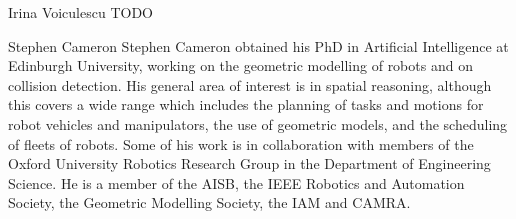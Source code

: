\documentclass[10pt,twocolumn,twoside]{IEEEtran}
\begin{document}
\begin{IEEEbiography}{Irina Voiculescu}
TODO
\end{IEEEbiography}

\begin{IEEEbiography}{Stephen Cameron}
Stephen Cameron obtained his PhD in Artificial Intelligence at Edinburgh University, working on the geometric modelling of robots and on collision detection. His general area of interest is in spatial reasoning, although this covers a wide range which includes the planning of tasks and motions for robot vehicles and manipulators, the use of geometric models, and the scheduling of fleets of robots. Some of his work is in collaboration with members of the Oxford University Robotics Research Group in the Department of Engineering Science. He is a member of the AISB, the IEEE Robotics and Automation Society, the Geometric Modelling Society, the IAM and CAMRA.
\end{IEEEbiography}
\end{document}
